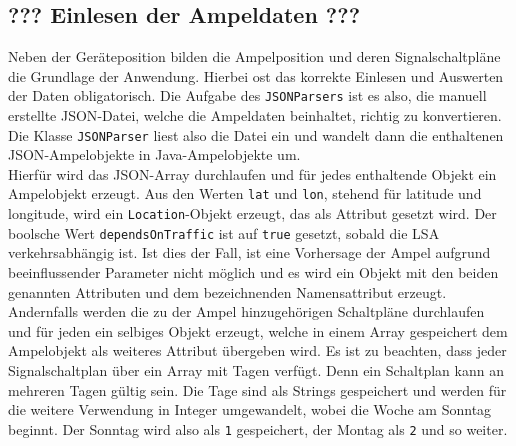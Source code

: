 \subsection{??? Einlesen der Ampeldaten ???}
Neben der Geräteposition bilden die Ampelposition und deren Signalschaltpläne die Grundlage der Anwendung. Hierbei ost das korrekte Einlesen und Auswerten der Daten obligatorisch. Die Aufgabe des \texttt{JSONParsers} ist es also, die manuell erstellte \gls{JSON}-Datei, welche die Ampeldaten beinhaltet, richtig zu konvertieren.  Die Klasse \texttt{JSONParser} liest also die Datei ein und wandelt dann die enthaltenen \gls{JSON}-Ampelobjekte in Java-Ampelobjekte um.\\ 
Hierfür wird das \gls{JSON}-Array durchlaufen und für jedes enthaltende Objekt ein Ampelobjekt erzeugt. Aus den Werten \texttt{lat} und \texttt{lon}, stehend für latitude und longitude, wird ein \texttt{Location}-Objekt erzeugt, das als Attribut gesetzt wird. Der boolsche Wert \texttt{dependsOnTraffic} ist auf \texttt{true} gesetzt, sobald die \gls{LSA} verkehrsabhängig ist. Ist dies der Fall, ist eine Vorhersage der Ampel aufgrund beeinflussender Parameter nicht möglich und es wird ein Objekt mit den beiden genannten Attributen und dem bezeichnenden Namensattribut erzeugt. Andernfalls werden die zu der Ampel hinzugehörigen Schaltpläne durchlaufen und für jeden ein selbiges Objekt erzeugt, welche in einem Array gespeichert dem Ampelobjekt als weiteres Attribut übergeben wird. Es ist zu beachten, dass jeder Signalschaltplan über ein Array mit Tagen verfügt. Denn ein Schaltplan kann an mehreren Tagen gültig sein. Die Tage sind als Strings gespeichert und werden für die weitere Verwendung in Integer umgewandelt, wobei die Woche am Sonntag beginnt. Der Sonntag wird also als \texttt{1} gespeichert, der Montag als \texttt{2} und so weiter. 
%
%
